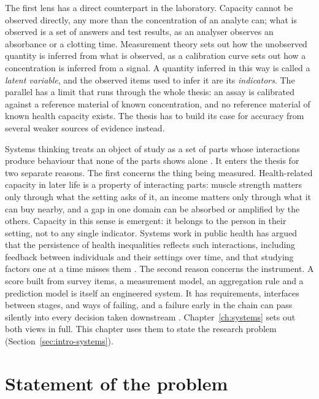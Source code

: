 The first lens has a direct counterpart in the laboratory. Capacity cannot be observed directly, any more than the concentration of an analyte can; what is observed is a set of answers and test results, as an analyser observes an absorbance or a clotting time. Measurement theory sets out how the unobserved quantity is inferred from what is observed, as a calibration curve sets out how a concentration is inferred from a signal. A quantity inferred in this way is called a \emph{latent variable}, and the observed items used to infer it are its \emph{indicators}. The parallel has a limit that runs through the whole thesis: an assay is calibrated against a reference material of known concentration, and no reference material of known health capacity exists. The thesis has to build its case for accuracy from several weaker sources of evidence instead.

Systems thinking treats an object of study as a set of parts whose interactions produce behaviour that none of the parts shows alone \citep{vonbertalanffy_1968,meadows_2008}. It enters the thesis for two separate reasons. The first concerns the thing being measured. Health-related capacity in later life is a property of interacting parts: muscle strength matters only through what the setting asks of it, an income matters only through what it can buy nearby, and a gap in one domain can be absorbed or amplified by the others. Capacity in this sense is emergent: it belongs to the person in their setting, not to any single indicator. Systems work in public health has argued that the persistence of health inequalities reflects such interactions, including feedback between individuals and their settings over time, and that studying factors one at a time misses them \citep{diez_roux_2011,rutter_2017}. The second reason concerns the instrument. A score built from survey items, a measurement model, an aggregation rule and a prediction model is itself an engineered system. It has requirements, interfaces between stages, and ways of failing, and a failure early in the chain can pass silently into every decision taken downstream \citep{incose_2015,leveson_2011}. Chapter~\ref{ch:systems} sets out both views in full. This chapter uses them to state the research problem (Section~\ref{sec:intro-systems}).

\section{Statement of the problem}
\label{sec:intro-traditions}

